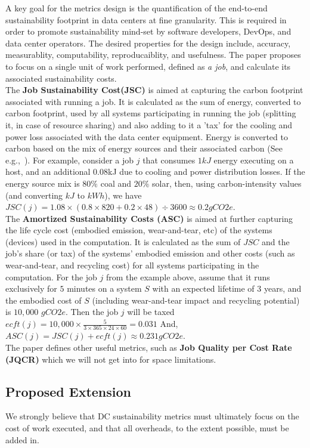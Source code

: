 A key goal for the metrics design is the quantification of the end-to-end sustainability footprint in data centers at fine granularity. This is required in order to promote sustainability mind-set by software developers, 
DevOps, and data center operators. The desired properties for the design include, accuracy, measurablity, computability, reproducaiblity, and usefulness. The paper proposes to focus on a single unit of work performed, defined as {\it a job}, and calculate its associated sustainability costs. 
\\
The \textbf{Job Sustainability Cost(JSC)} is aimed at capturing the carbon footprint associated with running a job. It is calculated as the sum of energy, converted to carbon footprint, used by all systems participating in running the job (splitting it, in case of resource sharing) and also adding to it a 'tax' for the cooling 
and power loss associated with the data center equipment. Energy is converted to carbon based on the mix of 
energy sources and their associated carbon (See e.g.,~\cite{}). For example, consider a job $j$ that consumes $1kJ$ energy executing on a host, and an additional 0.08kJ due to cooling and power distribution losses. If the energy source mix is $80\%$ coal and $20\%$ solar, then, using carbon-intensity values (and converting $kJ$ to $kWh$), we have $JSC(j) = 1.08 \times (0.8 \times 820 + 0.2 \times 48) \div 3600 \approx 0.2gCO2e$.  
\\
The \textbf{Amortized Sustainability Costs (ASC)} is aimed at further capturing the life cycle cost (embodied 
emission, wear-and-tear, etc)
of the systems (devices) used in the computation. It is calculated as the sum of $JSC$ and the job’s share (or tax) of the systems' embodied emission and other costs (such as wear-and-tear, and recycling cost) for all systems 
participating in the computation. For the job $j$ from the example above, assume that it runs exclusively for $5$ minutes on a system $S$ with an expected lifetime of $3$ years, and the embodied cost of $S$ (including wear-and-tear impact and recycling potential) is $10,000$ $gCO2e$. Then the job $j$ will be taxed $ecft(j) = 10,000 \times \frac{5}{3\times 365 \times 24 \times 60} = 0.031$ And, $ASC(j) = JSC(j)  +  ecft(j) \approx 0.231gCO2e$. 
\\
The paper defines other useful metrics, such as {\bf Job Quality per Cost Rate (JQCR)} which we will not get into for space limitations. 
\subsection{Proposed Extension}
We strongly believe that DC sustainability metrics must ultimately focus on the cost of work executed, and that all overheads, to the extent possible, must be added in. 


